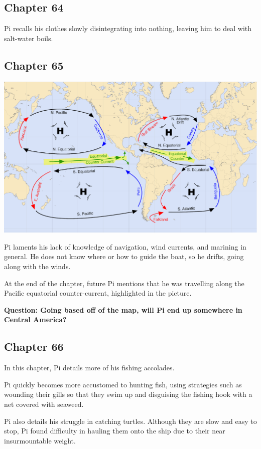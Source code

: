 \documentclass[11pt]{article}
\begin{document}
\subsection{Chapter 64}
\label{sec:org1392592}
Pi recalls his clothes slowly disintegrating into nothing, leaving him to deal with salt-water boils.
\subsection{Chapter 65}
\label{sec:org61924d6}
\begin{center}
\includegraphics[width=.9\linewidth]{./img/equatorial_countercurrent.png}
\end{center}

Pi laments his lack of knowledge of navigation, wind currents, and marining in general. He does not know where or how to guide the boat, so he drifts, going along with the winds.

At the end of the chapter, future Pi mentions that he was travelling along the Pacific equatorial counter-current, highlighted in the picture.

\textbf{Question: Going based off of the map, will Pi end up somewhere in Central America?}
\subsection{Chapter 66}
\label{sec:org7e58d35}
In this chapter, Pi details more of his fishing accolades.

Pi quickly becomes more accustomed to hunting fish, using strategies such as wounding their gills so that they swim up and disguising the fishing hook with a net covered with seaweed.

Pi also details his struggle in catching turtles. Although they are slow and easy to stop, Pi found difficulty in hauling them onto the ship due to their near insurmountable weight.
\end{document}
